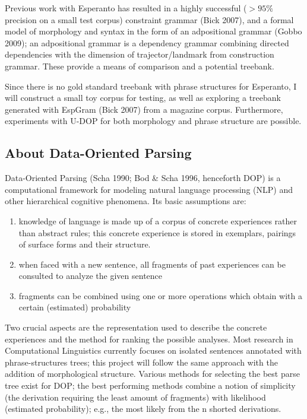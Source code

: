 \documentclass[10pt,a4paper]{article}
\begin{document}
Previous work with Esperanto has resulted in a highly successful
($>95\%$ precision on a small test corpus) constraint grammar (Bick 2007), and
a formal model of morphology and syntax in the form of an adpositional grammar
(Gobbo 2009); an adpositional grammar is a dependency grammar combining
directed dependencies with the dimension of trajector/landmark from
construction grammar. These provide a means of comparison and a potential
treebank.

Since there is no gold standard treebank with phrase structures for Esperanto,
I will construct a small toy corpus for testing, as well as exploring a
treebank generated with EspGram (Bick 2007) from a magazine corpus. Furthermore,
experiments with U-DOP for both morphology and phrase structure are possible.

\subsection{About Data-Oriented Parsing}

Data-Oriented Parsing (Scha 1990; Bod \& Scha 1996, henceforth DOP) is a
computational framework for modeling natural language processing (NLP) and
other hierarchical cognitive phenomena. Its basic assumptions are:

\begin{enumerate}
\item knowledge of language is made up of a corpus of concrete experiences
rather than abstract rules; this concrete experience is stored in
exemplars, pairings of surface forms and their structure.
\item when faced with a new sentence, all fragments of past experiences can be
consulted to analyze the given sentence
\item fragments can be combined using one or more operations which obtain with a
certain (estimated) probability
\end{enumerate}

Two crucial aspects are the representation used to describe the concrete
experiences and the method for ranking the possible analyses. Most research in
Computational Linguistics currently focuses on isolated sentences annotated
with phrase-structures trees; this project will follow the same approach with
the addition of morphological structure. Various methods for selecting the best
parse tree exist for DOP; the best performing methods combine a notion of
simplicity (the derivation requiring the least amount of fragments) with
likelihood (estimated probability); e.g., the most likely from the n shorted
derivations.
\end{document}

